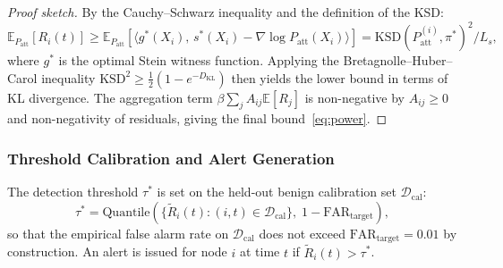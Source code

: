 \begin{proof}[Proof sketch]
By the Cauchy--Schwarz inequality and the definition of the KSD:
\begin{equation}
\mathbb{E}_{P_{\mathrm{att}}}[R_i(t)]
\ge \mathbb{E}_{P_{\mathrm{att}}}\!\left[
    \bigl\langle g^*(X_i),\, s^*(X_i) - \nabla\log P_{\mathrm{att}}(X_i)
    \bigr\rangle
  \right]
= \mathrm{KSD}(P_{\mathrm{att}}^{(i)}, \pi^*)^2 / L_s,
\end{equation}
where $g^*$ is the optimal Stein witness function.
Applying the Bretagnolle--Huber--Carol inequality
$\mathrm{KSD}^2 \ge \frac{1}{2}(1 - e^{-D_{\mathrm{KL}}})$ then yields the
lower bound in terms of KL divergence.
The aggregation term $\beta \sum_j A_{ij} \mathbb{E}[R_j]$ is non-negative
by $A_{ij} \ge 0$ and non-negativity of residuals, giving the final
bound~\eqref{eq:power}.
\end{proof}

\subsubsection{Threshold Calibration and Alert Generation}

The detection threshold $\tau^*$ is set on the held-out benign calibration
set $\mathcal{D}_\mathrm{cal}$:
\begin{equation}\label{eq:threshold}
\tau^* = \mathrm{Quantile}\!\left(
    \bigl\{\tilde{R}_i(t) : (i, t) \in \mathcal{D}_\mathrm{cal}\bigr\},\;
    1 - \mathrm{FAR}_{\mathrm{target}}
\right),
\end{equation}
so that the empirical false alarm rate on $\mathcal{D}_\mathrm{cal}$ does not
exceed $\mathrm{FAR}_{\mathrm{target}} = 0.01$ by construction.
An alert is issued for node $i$ at time $t$ if $\tilde{R}_i(t) > \tau^*$.

